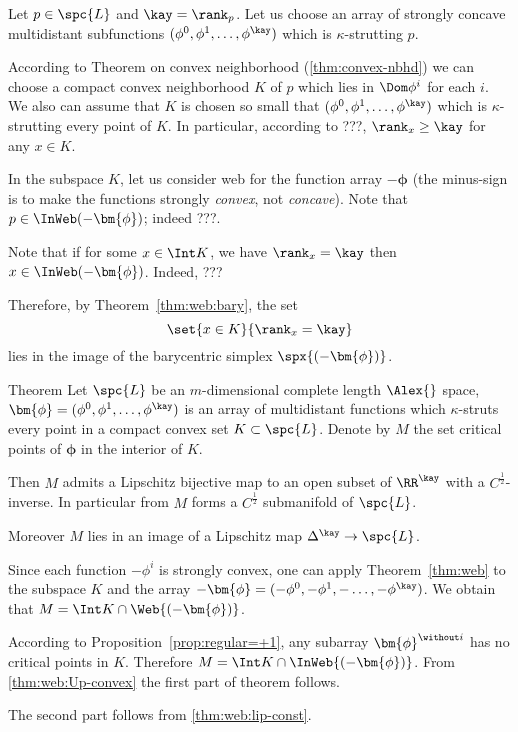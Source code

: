 Let $p\in\spc{L}$ and $\kay=\rank_p$.
Let us choose an array of strongly concave multidistant subfunctions $(\phi^0,\phi^1,\dots,\phi^\kay)$ which is $\kappa$-strutting $p$.

According to Theorem on convex neighborhood (\ref{thm:convex-nbhd}) we can choose a compact convex neighborhood $K$ of $p$
which lies in $\Dom\phi^i$ for each $i$.
We also can assume that $K$ is chosen so small that $(\phi^0,\phi^1,\dots,\phi^\kay)$ which is $\kappa$-strutting every point of $K$.
In particular, according to ???, $\rank_x\ge \kay$ for any $x\in K$. 

In the subspace $K$, 
let us consider web for the function array
$-\bm{\phi}$ (the minus-sign is to make the functions strongly \emph{convex}, not \emph{concave}).
Note that $p\in\InWeb(-\bm{\phi})$;
indeed ???.

Note that if for some $x\in\Int K$, 
we have $\rank_x=\kay$ 
then $x\in\InWeb (-\bm{\phi})$.
Indeed, ???

Therefore, by Theorem~\ref{thm:web:bary},
the set 
$$\set{x\in K}{\rank_x=\kay}$$
lies in the image of the barycentric simplex $\spx{(-\bm{\phi})}$.

\begin{thm}{Theorem}
Let $\spc{L}$ be an $m$-dimensional complete length $\Alex{}$ space,
$\bm{\phi}=(\phi^0,\phi^1,\dots,\phi^\kay)$ 
is an array of multidistant functions which 
$\kappa$-struts every point in a compact convex set $K\subset  \spc{L}$.
Denote by $M$ the set critical points of $\bm{\phi}$ in the interior of $K$.

Then $M$
admits a Lipschitz bijective map to an open subset of $\RR^\kay$ with a $C^{\frac12}$-inverse.
In particular from $M$ forms a $C^{\frac12}$ submanifold of $\spc{L}$.

Moreover $M$ lies in an image of a Lipschitz map $\Delta^\kay\to \spc{L}$.
\end{thm}

Since each function $-\phi^i$ is strongly convex,
one can apply Theorem~\ref{thm:web} to the
subspace $K$
and the array $-\bm{\phi}=(-\phi^0,-\phi^1,-\dots,-\phi^\kay)$.
We obtain that $M=\Int K\cap \Web{(-\bm{\phi})}$.

According to Proposition~\ref{prop:regular=+1}, 
any subarray $\bm{\phi}^{\without i}$
has no critical points in $K$.
Therefore $M=\Int K\cap\InWeb{(-\bm{\phi})}$.
From \ref{thm:web:Up-convex} the first part of theorem follows.

The second part follows from \ref{thm:web:lip-const}.
\qeds


